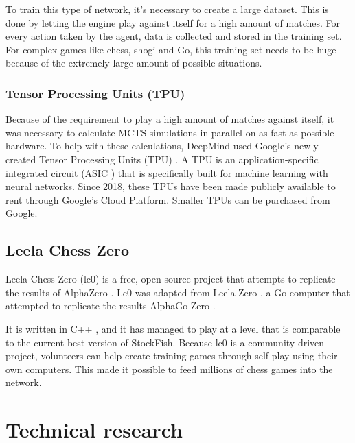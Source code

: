 \documentclass{article}
\begin{document}
To train this type of network, it's necessary to create a large dataset. 
This is done by letting the engine play against itself for a high amount of matches. 
For every action taken by the agent, data is collected and stored in the training set.
For complex games like chess, shogi and Go, this training set needs to be huge
because of the extremely large amount of possible situations.

\subsubsection{Tensor Processing Units (TPU)}

Because of the requirement to play a high amount of matches against itself, it was necessary to calculate
MCTS simulations in parallel on as fast as possible hardware. 
To help with these calculations, DeepMind used Google's newly created Tensor Processing Units (TPU) \cite{TensorProcessingUnit2022}.
A TPU is an application-specific integrated circuit (ASIC \cite{ApplicationspecificIntegratedCircuit2022}) that is specifically built for machine learning with
neural networks. Since 2018, these TPUs have been made publicly available to rent through Google's Cloud Platform. Smaller TPUs 
can be purchased from Google. 

\subsection{Leela Chess Zero}

Leela Chess Zero (lc0) is a free, open-source project that attempts to replicate the results of AlphaZero \cite{LeelaChessZero2022}. 
Lc0 was adapted from Leela Zero \cite{LeelaZero2021}, a Go computer that attempted to replicate the results AlphaGo Zero \cite{AlphaGoZero2022}. 

It is written in C++ \cite{Lc02022}, and it has managed to play at a level that is comparable to the current best version of StockFish.
Because lc0 is a community driven project, volunteers can help create training games through self-play using their own computers.
This made it possible to feed millions of chess games into the network. 

\newpage
\section{Technical research}

\end{document}
